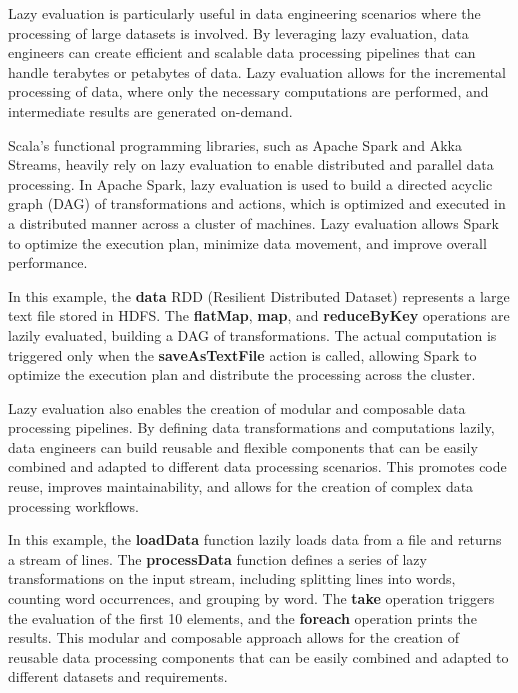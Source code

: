 Lazy evaluation is particularly useful in data engineering scenarios where the processing of large datasets is involved. By leveraging lazy evaluation, data engineers can create efficient and scalable data processing pipelines that can handle terabytes or petabytes of data. Lazy evaluation allows for the incremental processing of data, where only the necessary computations are performed, and intermediate results are generated on-demand.

Scala's functional programming libraries, such as Apache Spark and Akka Streams, heavily rely on lazy evaluation to enable distributed and parallel data processing. In Apache Spark, lazy evaluation is used to build a directed acyclic graph (DAG) of transformations and actions, which is optimized and executed in a distributed manner across a cluster of machines. Lazy evaluation allows Spark to optimize the execution plan, minimize data movement, and improve overall performance.



In this example, the \textbf{data} RDD (Resilient Distributed Dataset) represents a large text file stored in HDFS. The \textbf{flatMap}, \textbf{map}, and \textbf{reduceByKey} operations are lazily evaluated, building a DAG of transformations. The actual computation is triggered only when the \textbf{saveAsTextFile} action is called, allowing Spark to optimize the execution plan and distribute the processing across the cluster.

Lazy evaluation also enables the creation of modular and composable data processing pipelines. By defining data transformations and computations lazily, data engineers can build reusable and flexible components that can be easily combined and adapted to different data processing scenarios. This promotes code reuse, improves maintainability, and allows for the creation of complex data processing workflows.



In this example, the \textbf{loadData} function lazily loads data from a file and returns a stream of lines. The \textbf{processData} function defines a series of lazy transformations on the input stream, including splitting lines into words, counting word occurrences, and grouping by word. The \textbf{take} operation triggers the evaluation of the first 10 elements, and the \textbf{foreach} operation prints the results. This modular and composable approach allows for the creation of reusable data processing components that can be easily combined and adapted to different datasets and requirements.

